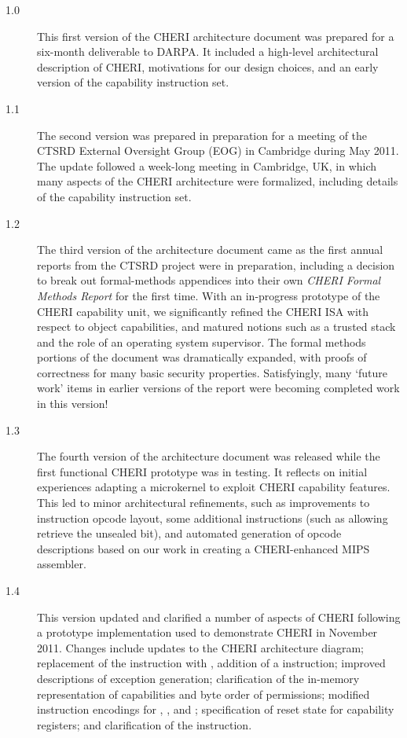 \begin{description}
\item[1.0] This first version of the CHERI architecture document was prepared
  for a six-month deliverable to DARPA.
  It included a high-level architectural description of CHERI, motivations
  for our design choices, and an early version of the capability instruction
  set.

\item[1.1] The second version was prepared in preparation for a meeting of the
  CTSRD External Oversight Group (EOG) in Cambridge during May 2011.
  The update followed a week-long meeting in Cambridge, UK, in which many
  aspects of the CHERI architecture were formalized, including
  details of the capability instruction set.

\item[1.2] The third version of the architecture document came as the first
  annual reports from the CTSRD project were in preparation, including a
  decision to break out formal-methods appendices into their own {\em CHERI
  Formal Methods Report} for the first time.
  With an in-progress prototype of the CHERI capability unit, we
  significantly refined the CHERI ISA with respect to object capabilities, and
  matured notions such as a trusted stack and the role of an
  operating system supervisor.
  The formal methods portions of the document was dramatically
  expanded, with proofs of correctness for many basic security properties.
  Satisfyingly, many `future work' items in earlier versions of the report
  were becoming completed work in this version!

\item[1.3] The fourth version of the architecture document was released 
  while 
  the first functional CHERI prototype was in testing.  It reflects on
  initial experiences adapting a microkernel to exploit CHERI capability
  features.
  This led to minor architectural refinements, such as improvements to
  instruction opcode layout, some additional instructions (such as allowing
   retrieve the unsealed bit), and automated
  generation of opcode descriptions based on our work in creating a
  CHERI-enhanced MIPS assembler.

\item[1.4] This version updated and clarified a number of aspects of CHERI
  following a prototype implementation used to demonstrate CHERI in November
  2011.
  Changes include updates to the CHERI architecture diagram; replacement of
  the  instruction with ,
  addition of a  instruction;
  improved descriptions of exception generation; clarification of the
  in-memory representation of capabilities and byte order of permissions;
  modified instruction encodings for ,
  , and ;
  specification of reset state for capability registers; and clarification of
  the  instruction.


\end{description}
